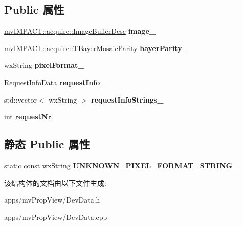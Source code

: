 \subsection*{Public 属性}
\begin{DoxyCompactItemize}
\item 
\hypertarget{struct_request_data_a43de17e0d0e774376b20ab080860ac3e}{\hyperlink{classmv_i_m_p_a_c_t_1_1acquire_1_1_image_buffer_desc}{mv\+I\+M\+P\+A\+C\+T\+::acquire\+::\+Image\+Buffer\+Desc} {\bfseries image\+\_\+}}\label{struct_request_data_a43de17e0d0e774376b20ab080860ac3e}

\item 
\hypertarget{struct_request_data_a43d5cc19ea21c5663f2199f77e008e84}{\hyperlink{group___common_interface_ga9e2a1b46f3ed21b46b867c6d88d25598}{mv\+I\+M\+P\+A\+C\+T\+::acquire\+::\+T\+Bayer\+Mosaic\+Parity} {\bfseries bayer\+Parity\+\_\+}}\label{struct_request_data_a43d5cc19ea21c5663f2199f77e008e84}

\item 
\hypertarget{struct_request_data_a0875095c705ea45ecc27c1777292fb64}{wx\+String {\bfseries pixel\+Format\+\_\+}}\label{struct_request_data_a0875095c705ea45ecc27c1777292fb64}

\item 
\hypertarget{struct_request_data_aca8309921a13c20cdea60a90635868bf}{\hyperlink{struct_request_info_data}{Request\+Info\+Data} {\bfseries request\+Info\+\_\+}}\label{struct_request_data_aca8309921a13c20cdea60a90635868bf}

\item 
\hypertarget{struct_request_data_ae5675fa8bbcbfb0019b8cf1f9a991f9b}{std\+::vector$<$ wx\+String $>$ {\bfseries request\+Info\+Strings\+\_\+}}\label{struct_request_data_ae5675fa8bbcbfb0019b8cf1f9a991f9b}

\item 
\hypertarget{struct_request_data_aaa0a5aad40bdbe2ecb2b35e6e97c29c4}{int {\bfseries request\+Nr\+\_\+}}\label{struct_request_data_aaa0a5aad40bdbe2ecb2b35e6e97c29c4}

\end{DoxyCompactItemize}
\subsection*{静态 Public 属性}
\begin{DoxyCompactItemize}
\item 
\hypertarget{struct_request_data_a5f97c114a9e3823addaf726fd556ba53}{static const wx\+String {\bfseries U\+N\+K\+N\+O\+W\+N\+\_\+\+P\+I\+X\+E\+L\+\_\+\+F\+O\+R\+M\+A\+T\+\_\+\+S\+T\+R\+I\+N\+G\+\_\+}}\label{struct_request_data_a5f97c114a9e3823addaf726fd556ba53}

\end{DoxyCompactItemize}


该结构体的文档由以下文件生成\+:\begin{DoxyCompactItemize}
\item 
apps/mv\+Prop\+View/Dev\+Data.\+h\item 
apps/mv\+Prop\+View/Dev\+Data.\+cpp\end{DoxyCompactItemize}
